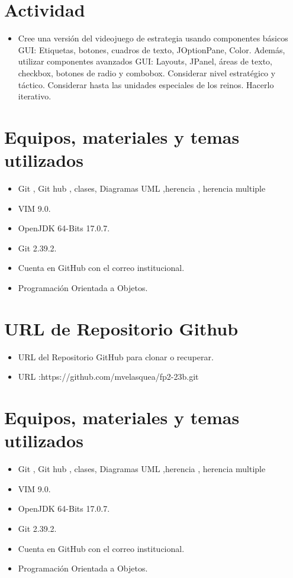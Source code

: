 \documentclass{article}
\begin{document}
	\section{Actividad}
	\begin{itemize}		
		\item Cree una versión del videojuego de estrategia usando componentes básicos GUI: Etiquetas, botones,
cuadros de texto, JOptionPane, Color.
Además, utilizar componentes avanzados GUI: Layouts, JPanel, áreas de texto, checkbox, botones de
radio y combobox.
Considerar nivel estratégico y táctico.
Considerar hasta las unidades especiales de los reinos.
Hacerlo iterativo.
		
		\end{itemize}
	\section{Equipos, materiales y temas utilizados}
	\begin{itemize}
		\item Git , Git hub , clases, Diagramas UML ,herencia , herencia multiple
		\item VIM 9.0.
		\item OpenJDK 64-Bits 17.0.7.
		\item Git 2.39.2.
		\item Cuenta en GitHub con el correo institucional.
		\item Programación Orientada a Objetos.
	\end{itemize}
	
	\section{URL de Repositorio Github}
	\begin{itemize}
		\item URL del Repositorio GitHub para clonar o recuperar.
			\item URL :https://github.com/mvelasquea/fp2-23b.git
\end{itemize}
	\section{Equipos, materiales y temas utilizados}
	\begin{itemize}
		\item Git , Git hub , clases, Diagramas UML ,herencia , herencia multiple
		\item VIM 9.0.
		\item OpenJDK 64-Bits 17.0.7.
		\item Git 2.39.2.
		\item Cuenta en GitHub con el correo institucional.
		\item Programación Orientada a Objetos.
	\end{itemize}
	
\end{document}

